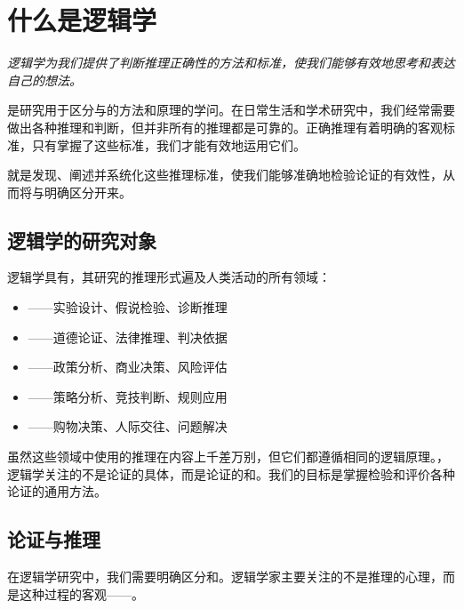 \section{什么是逻辑学}

\begin{logicbox}[title=引言]
\textit{逻辑学为我们提供了判断推理正确性的方法和标准，使我们能够有效地思考和表达自己的想法。}
\end{logicbox}

是研究用于区分与的方法和原理的学问。在日常生活和学术研究中，我们经常需要做出各种推理和判断，但并非所有的推理都是可靠的。正确推理有着明确的客观标准，只有掌握了这些标准，我们才能有效地运用它们。

就是发现、阐述并系统化这些推理标准，使我们能够准确地检验论证的有效性，从而将与明确区分开来。

\subsection{逻辑学的研究对象}

逻辑学具有，其研究的推理形式遍及人类活动的所有领域：

\begin{itemize}
  \item {}——实验设计、假说检验、诊断推理
  \item {}——道德论证、法律推理、判决依据
  \item {}——政策分析、商业决策、风险评估
  \item {}——策略分析、竞技判断、规则应用
  \item {}——购物决策、人际交往、问题解决
\end{itemize}

虽然这些领域中使用的推理在内容上千差万别，但它们都遵循相同的逻辑原理。，逻辑学关注的不是论证的具体，而是论证的和。我们的目标是掌握检验和评价各种论证的通用方法。

\subsection{论证与推理}

在逻辑学研究中，我们需要明确区分和。逻辑学家主要关注的不是推理的心理，而是这种过程的客观——。

